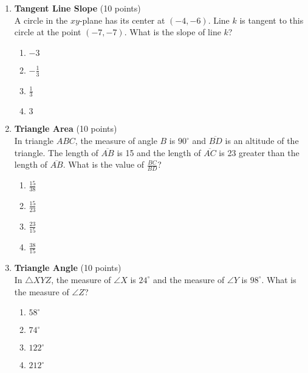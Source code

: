 \begin{enumerate}
  \newpage

  \item \textbf{Tangent Line Slope} (10 points)\\
  A circle in the $xy$-plane has its center at $(-4,-6)$. Line $k$ is tangent to this circle at the point $(-7,-7)$. What is the slope of line $k$?\\
  \begin{enumerate}[label=(\Alph*)]
    \item $-3$
    \item $-\frac{1}{3}$
    \item $\frac{1}{3}$
    \item $3$
  \end{enumerate}
  \begin{subanswer}
  \end{subanswer}

  \item \textbf{Triangle Area} (10 points)\\
  In triangle $A B C$, the measure of angle $B$ is $90^{\circ}$ and $\overline{B D}$ is an altitude of the triangle. The length of $\overline{A B}$ is 15 and the length of $\overline{A C}$ is 23 greater than the length of $\overline{A B}$. What is the value of $\frac{B C}{B D}$?\\
  \begin{enumerate}[label=(\Alph*)]
    \item $\frac{15}{38}$
    \item $\frac{15}{23}$
    \item $\frac{23}{15}$
    \item $\frac{38}{15}$
  \end{enumerate}
  \begin{subanswer}
  \end{subanswer}

  \item \textbf{Triangle Angle} (10 points)\\
  In $\triangle X Y Z$, the measure of $\angle X$ is $24^{\circ}$ and the measure of $\angle Y$ is $98^{\circ}$. What is the measure of $\angle Z$?\\
  \begin{enumerate}[label=(\Alph*)]
    \item $58^{\circ}$
    \item $74^{\circ}$
    \item $122^{\circ}$
    \item $212^{\circ}$
  \end{enumerate}
  \begin{subanswer}
  \end{subanswer}


\end{enumerate}
